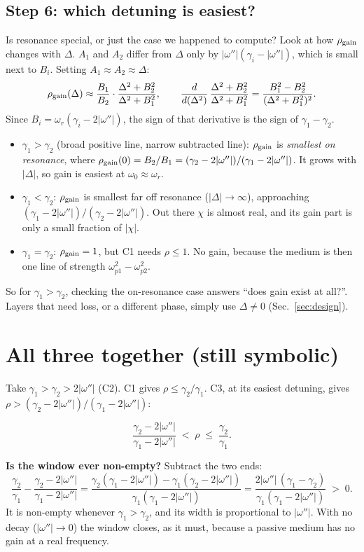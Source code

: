 \documentclass[11pt]{article}
\newcommand{\wi}{|\omega''|}          %
\newcommand{\wpa}{\omega_{p1}}
\newcommand{\wpb}{\omega_{p2}}
\begin{document}
\subsection*{Step 6: which detuning is easiest?}
Is resonance special, or just the case we happened to compute? Look at how $\rho_{\rm gain}$ changes with $\Delta$.
$A_1$ and $A_2$ differ from $\Delta$ only by $\wi(\gamma_i-\wi)$, which is small next to $B_i$. Setting $A_1\approx A_2\approx\Delta$:
\begin{equation}
  \rho_{\rm gain}(\Delta) \approx \frac{B_1}{B_2}\cdot\frac{\Delta^2+B_2^2}{\Delta^2+B_1^2},
  \qquad
  \frac{d}{d(\Delta^2)}\,\frac{\Delta^2+B_2^2}{\Delta^2+B_1^2} = \frac{B_1^2-B_2^2}{(\Delta^2+B_1^2)^2}.
\end{equation}
Since $B_i=\omega_r(\gamma_i-2\wi)$, the sign of that derivative is the sign of $\gamma_1-\gamma_2$.
\begin{itemize}
  \item $\gamma_1>\gamma_2$ (broad positive line, narrow subtracted line): $\rho_{\rm gain}$ is \emph{smallest on resonance}, where
  $\rho_{\rm gain}(0)=B_2/B_1=(\gamma_2-2\wi)/(\gamma_1-2\wi)$. It grows with $|\Delta|$, so gain is easiest at $\omega_0\approx\omega_r$.
  \item $\gamma_1<\gamma_2$: $\rho_{\rm gain}$ is smallest far off resonance ($|\Delta|\to\infty$), approaching $(\gamma_1-2\wi)/(\gamma_2-2\wi)$.
  Out there $\chi$ is almost real, and its gain part is only a small fraction of $|\chi|$.
  \item $\gamma_1=\gamma_2$: $\rho_{\rm gain}=1$, but C1 needs $\rho\le1$. No gain, because the medium is then one line of strength $\wpa^2-\wpb^2$.
\end{itemize}
So for $\gamma_1>\gamma_2$, checking the on-resonance case answers ``does gain exist at all?''.
Layers that need loss, or a different phase, simply use $\Delta\neq0$ (Sec.~\ref{sec:design}).

\section{All three together (still symbolic)}
Take $\gamma_1>\gamma_2>2\wi$ (C2). C1 gives $\rho\le\gamma_2/\gamma_1$. C3, at its easiest detuning, gives $\rho>(\gamma_2-2\wi)/(\gamma_1-2\wi)$:
\begin{result}
\begin{equation}
  \frac{\gamma_2-2\wi}{\gamma_1-2\wi} \;<\; \rho \;\le\; \frac{\gamma_2}{\gamma_1}.
  \label{eq:window}
\end{equation}
\end{result}
\noindent\textbf{Is the window ever non-empty?} Subtract the two ends:
\begin{equation}
  \frac{\gamma_2}{\gamma_1} - \frac{\gamma_2-2\wi}{\gamma_1-2\wi}
  = \frac{\gamma_2(\gamma_1-2\wi) - \gamma_1(\gamma_2-2\wi)}{\gamma_1(\gamma_1-2\wi)}
  = \frac{2\wi\,(\gamma_1-\gamma_2)}{\gamma_1(\gamma_1-2\wi)} \;>\;0 .
\end{equation}
It is non-empty whenever $\gamma_1>\gamma_2$, and its width is proportional to $\wi$.
With no decay ($\wi\to0$) the window closes, as it must, because a passive medium has no gain at a real frequency.
\end{document}

